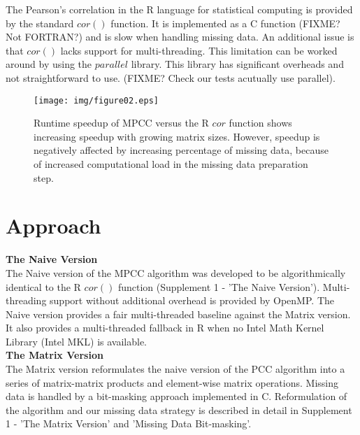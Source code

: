 \documentclass{bioinfo}
\begin{document}

The Pearson's correlation in the R language for statistical
computing \citep{R:2005} is provided by the standard $cor()$
function. It is implemented as a C function (FIXME? Not FORTRAN?)  and
is slow when handling missing data.  An additional issue is that
$cor()$ lacks support for multi-threading. This limitation can be
worked around by using the $parallel$ library. This library has
significant overheads and not straightforward to use. (FIXME? Check
our tests acutually use parallel).



\vspace*{-5mm}

\begin{figure}[!t]
  \centerline{\texttt{[image: img/figure02.eps]}}
  \vspace*{-7mm}
  \caption{
    Runtime speedup of MPCC versus the R $cor$ function shows
    increasing speedup with growing matrix sizes. However,
    speedup is negatively affected by increasing percentage of
    missing data, because of increased computational load in the
    missing data preparation step.
  }
  \label{fig:fig2}
  \vspace*{-5mm}
\end{figure}

\section{Approach}

\textbf{The Naive Version}\\
The Naive version of the MPCC algorithm was developed to be
algorithmically identical to the R $cor()$ function (Supplement 1 -
'The Naive Version'). Multi-threading support without additional
overhead is provided by OpenMP. The Naive version provides a fair
multi-threaded baseline against the Matrix version. It also provides a
multi-threaded fallback in R when no Intel\textregistered{} Math
Kernel Library (Intel\textregistered{} MKL) is available.\\
\textbf{The Matrix Version}\\
The Matrix version reformulates the naive version of the PCC algorithm
into a series of matrix-matrix products and element-wise matrix operations.
Missing data is handled by a bit-masking approach implemented in C.
Reformulation of the algorithm and our missing data strategy is described
in detail in Supplement 1 - 'The Matrix Version' and 'Missing Data Bit-masking'.
\end{document}
